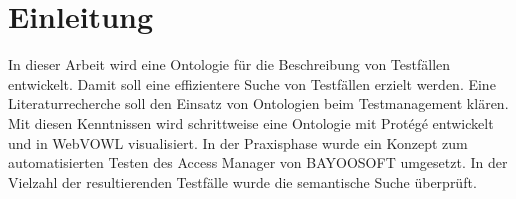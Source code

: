 \chapter{Einleitung}
In dieser Arbeit wird eine Ontologie für die Beschreibung von Testfällen entwickelt. Damit soll eine effizientere Suche von Testfällen erzielt werden. Eine Literaturrecherche soll den Einsatz von Ontologien beim Testmanagement klären. Mit diesen Kenntnissen wird schrittweise eine Ontologie mit Protégé entwickelt und in WebVOWL visualisiert. In der Praxisphase wurde ein Konzept zum automatisierten Testen des Access Manager von BAYOOSOFT umgesetzt. In der Vielzahl der resultierenden Testfälle wurde die semantische Suche überprüft. 